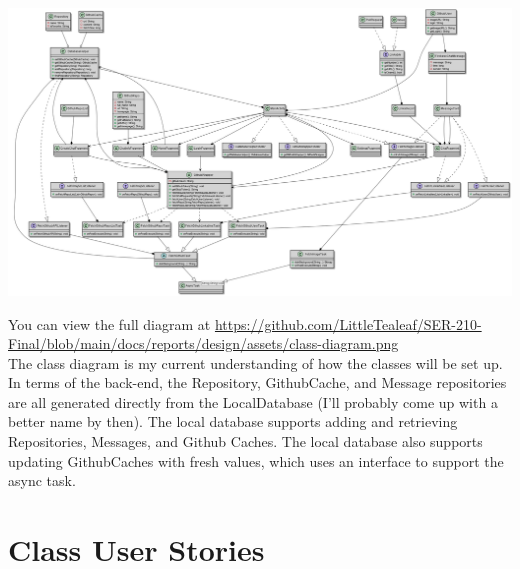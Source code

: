\documentclass{report}
\begin{document}
\begin{center}
    \includegraphics[scale=0.2]{class-diagram}
\end{center}
You can view the full diagram at \href{https://github.com/LittleTealeaf/SER-210-Final/blob/main/docs/reports/design/assets/class-diagram.png}{https://github.com/LittleTealeaf/SER-210-Final/blob/main/docs/reports/design/assets/class-diagram.png}\\

The class diagram is my current understanding of how the classes will be set up. In terms of the back-end, the Repository, GithubCache, and Message repositories are all generated directly from the LocalDatabase (I'll probably come up with a better name by then). The local database supports adding and retrieving Repositories, Messages, and Github Caches. The local database also supports updating GithubCaches with fresh values, which uses an interface to support the async task.

\section{Class User Stories}
\end{document}
